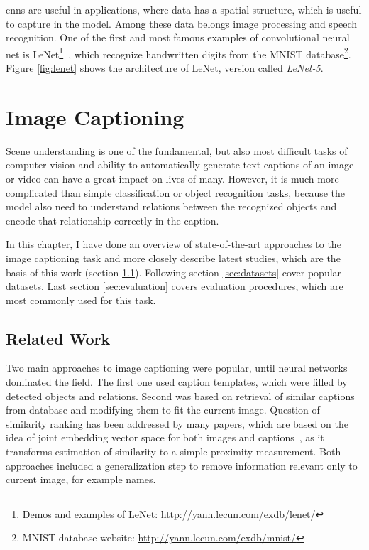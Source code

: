 \gls{cnn}s are useful in applications, where data has a spatial structure, which is useful to capture in the model. Among these data belongs image processing and speech recognition. One of the first and most famous examples of convolutional neural net is LeNet\footnote{Demos and examples of LeNet: \url{http://yann.lecun.com/exdb/lenet/}}~\cite{lecun-98}, which recognize handwritten digits from the MNIST database\footnote{MNIST database website: \url{http://yann.lecun.com/exdb/mnist/}}. Figure \ref{fig:lenet} shows the architecture of LeNet, version called \emph{LeNet-5}.

\chapter{Image Captioning}\label{chp:captions}

Scene understanding is one of the fundamental, but also most difficult tasks of computer vision and ability to automatically generate text captions of an image or video can have a great impact on lives of many. However, it is much more complicated than simple classification or object recognition tasks, because the model also need to understand relations between the recognized objects and encode that relationship correctly in the caption.

In this chapter, I have done an overview of state-of-the-art approaches to the image captioning task and more closely describe latest studies, which are the basis of this work (section \ref{sec:related}). Following section \ref{sec:datasets} cover popular datasets. Last section \ref{sec:evaluation} covers evaluation procedures, which are most commonly used for this task.

\section{Related Work}\label{sec:related}

Two main approaches to image captioning were popular, until neural networks dominated the field. The first one used caption templates, which were filled by detected objects and relations. Second was based on retrieval of similar captions from database and modifying them to fit the current image. Question of similarity ranking has been addressed by many papers, which are based on the idea of joint embedding vector space for both images and captions~\cite{DBLP:journals/corr/KarpathyF14}, as it transforms estimation of similarity to a simple proximity measurement. Both approaches included a generalization step to remove information relevant only to current image, for example names.


